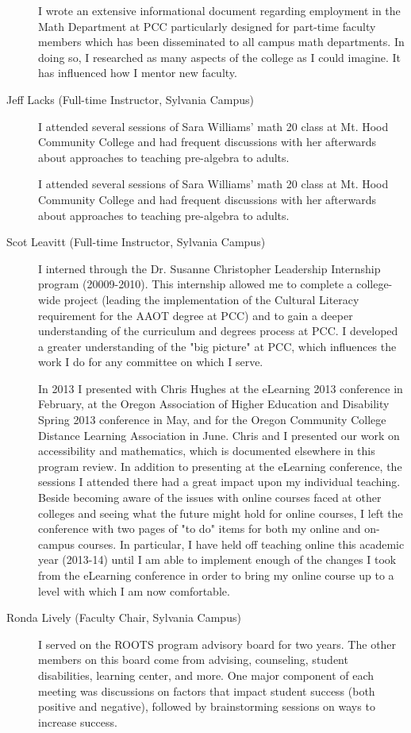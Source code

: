 \begin{description}
	I wrote an extensive informational document regarding employment in the Math
	Department at PCC particularly designed for part-time faculty members which has
	been disseminated to all campus math departments. In doing so, I researched as
	many aspects of the college as I could imagine. It has influenced how I mentor
	new faculty.

	\item[Jeff Lacks (Full-time Instructor, Sylvania Campus)]
	I attended several sessions of Sara Williams' math 20 class at Mt. Hood
	Community College and had frequent discussions with her afterwards about
	approaches to teaching pre-algebra to adults.

	I attended several sessions of Sara Williams' math 20 class at Mt. Hood
	Community College and had frequent discussions with her afterwards about
	approaches to teaching pre-algebra to adults.

	\item[Scot Leavitt (Full-time Instructor, Sylvania Campus)]
	I interned through the Dr. Susanne Christopher Leadership Internship program
	(20009-2010).  This internship allowed me to complete a college-wide project
	(leading the implementation of the Cultural Literacy requirement for the AAOT
	degree at PCC) and to gain a deeper understanding of the curriculum and degrees
	process at PCC.  I developed a greater understanding of the "big picture" at
	PCC, which influences the work I do for any committee on which I serve.

	In 2013 I presented with Chris Hughes at the eLearning 2013 conference
	in February, at the Oregon Association of Higher Education and Disability
	Spring 2013 conference in May, and for the Oregon Community College Distance
	Learning Association in June.  Chris and I presented our work on accessibility
	and mathematics, which is documented elsewhere in this program review.  In
	addition to presenting at the eLearning conference, the sessions I attended
	there had a great impact upon my individual teaching.  Beside becoming aware of
	the issues with online courses faced at other colleges and seeing what the
	future might hold for online courses, I left the conference with two pages of
	"to do" items for both my online and on-campus courses.  In particular, I have
	held off teaching online this academic year (2013-14) until I am able to
	implement enough of the changes I took from the eLearning conference in order
	to bring my online course up to a level with which I am now comfortable.

	\item[Ronda Lively (Faculty Chair, Sylvania Campus)]
	I served on the ROOTS program advisory board for two years.  The other members
	on this board come from advising, counseling, student disabilities, learning
	center, and more. One major component of each meeting was discussions on
	factors that impact student success (both positive and negative), followed by
	brainstorming sessions on ways to increase success.


\end{description}

